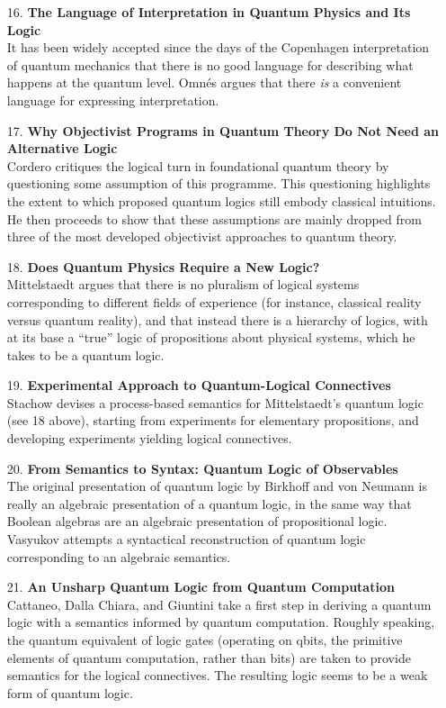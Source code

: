 \documentclass[11pt]{article}
\newcommand{\<}{\langle}
\renewcommand{\>}{\rangle}
\begin{document}
\begin{itemize}
\item[16.] \textbf{The Language of Interpretation in Quantum Physics
and Its Logic}\\
It has been widely accepted since the days of the Copenhagen
interpretation of quantum mechanics that there is no good language for
describing what happens at the quantum level. Omn\'es argues that
there \emph{is} a convenient language for expressing interpretation.

\item[17.] \textbf{Why Objectivist Programs in Quantum Theory Do Not
Need an Alternative Logic}\\
Cordero critiques the logical turn in foundational quantum theory by
questioning some assumption of this programme. 
This questioning highlights the extent to which proposed quantum
logics still embody classical intuitions.
He then proceeds to show that these assumptions are mainly dropped
from three of the most developed objectivist approaches to quantum
theory. 

\item[18.] \textbf{Does Quantum Physics Require a New Logic?}\\
Mittelstaedt argues that there is no pluralism of logical systems
corresponding to different fields of experience (for instance,
classical reality versus quantum reality), and that instead there is a
hierarchy of logics, with at its base a ``true'' logic of propositions
about physical systems, which he takes to be a quantum logic.

\item[19.] \textbf{Experimental Approach to Quantum-Logical
Connectives}\\
Stachow devises a process-based semantics for Mittelstaedt's quantum
logic (see 18 above), starting from experiments for elementary
propositions, and developing experiments yielding logical connectives.

\item[20.] \textbf{From Semantics to Syntax: Quantum Logic of
Observables}\\
The original presentation of quantum logic by Birkhoff and von Neumann
is really an algebraic presentation of a quantum logic, in the same
way that Boolean algebras are an algebraic presentation of
propositional logic. 
Vasyukov attempts a syntactical reconstruction of quantum logic
corresponding to an algebraic semantics. 

\item[21.] \textbf{An Unsharp Quantum Logic from Quantum
Computation}\\
Cattaneo, Dalla Chiara, and Giuntini take a first step in  deriving a
quantum logic with a semantics informed by quantum computation. 
Roughly speaking, the quantum equivalent of logic gates (operating on
qbits, the primitive elements of quantum computation, rather than bits)
are taken to provide semantics for the logical connectives. 
The resulting logic seems to be a weak form of quantum logic.


\end{itemize}
\end{document}
